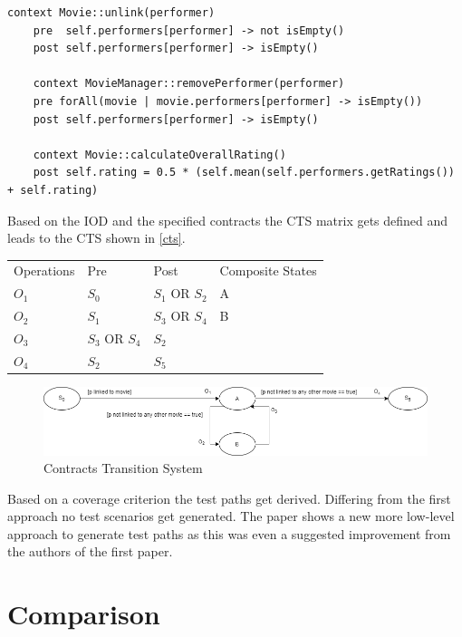 \begin{lstlisting}[caption={Contracts written in OCL},label={contracts2}]
	context Movie::unlink(performer)
	pre  self.performers[performer] -> not isEmpty()
	post self.performers[performer] -> isEmpty()
	
	context MovieManager::removePerformer(performer)
	pre forAll(movie | movie.performers[performer] -> isEmpty())
	post self.performers[performer] -> isEmpty()
	
	context Movie::calculateOverallRating()
	post self.rating = 0.5 * (self.mean(self.performers.getRatings()) + self.rating)
\end{lstlisting}

Based on the IOD and the specified contracts the CTS matrix gets defined and leads to the CTS shown in \autoref{cts}.

\begin{longtable}[h]{llll}
	Operations & Pre & Post & Composite States \\
	$O_{1}$ & $S_{0}$ & $S_{1}$ OR $S_{2}$ & A \\
	$O_{2}$ & $S_{1}$ & $S_{3}$ OR $S_{4}$ & B \\
	$O_{3}$ & $S_{3}$ OR $S_{4}$ & $S_{2}$ & \\
	$O_{4}$ & $S_{2}$ & $S_{5}$ & \\
\end{longtable}

\begin{figure}[h]
	\centering
	\includegraphics[width=\textwidth]{./images/cts.png}
	\caption{Contracts Transition System}
	\label{cts}
\end{figure}

Based on a coverage criterion the test paths get derived. Differing from the first approach no test scenarios get generated. The paper shows a new more low-level approach to generate test paths as this was even a suggested improvement from the authors of the first paper. 

\section{Comparison} \label{comparison}

